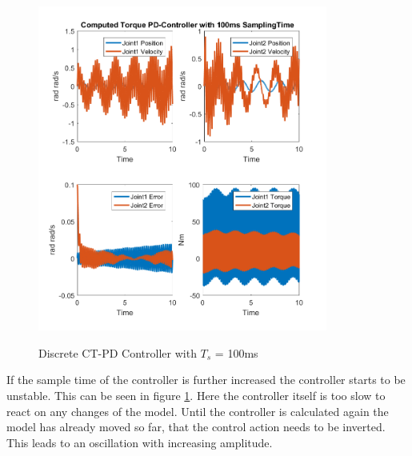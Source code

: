 \begin{figure}[h]
	\centering
	\includegraphics[width=0.85\textwidth]{pics/ComputedTorquePD-Controllerwith100msSamplingTime.png}\\
	\caption{Discrete CT-PD Controller with $T_s$ = 100ms}
	\label{fig:ch3_digi3}
\end{figure}
 
 If the sample time of the controller is further increased the controller starts to be unstable. This can be seen in figure \ref{fig:ch3_digi3}. Here the controller itself is too slow to react on any changes of the model. Until the controller is calculated again the model has already moved so far, that the control action needs to be inverted. This leads to an oscillation with increasing amplitude.